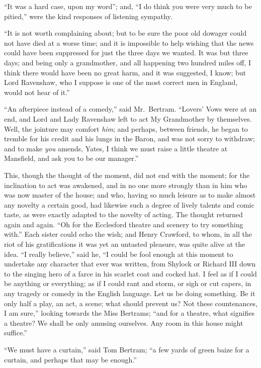 \documentclass{article}
\begin{document}
``It was a hard case, upon my word''; and, ``I do think you
were very much to be pitied,'' were the kind responses
of listening sympathy.

``It is not worth complaining about; but to be sure the
poor old dowager could not have died at a worse time;
and it is impossible to help wishing that the news could
have been suppressed for just the three days we wanted.
It was but three days; and being only a grandmother,
and all happening two hundred miles off, I think there would
have been no great harm, and it was suggested, I know;
but Lord Ravenshaw, who I suppose is one of the most correct
men in England, would not hear of it.''

``An afterpiece instead of a comedy,'' said Mr.\ Bertram.
``Lovers' Vows were at an end, and Lord and Lady Ravenshaw
left to act My Grandmother by themselves.  Well, the jointure
may comfort \emph{him}; and perhaps, between friends, he began
to tremble for his credit and his lungs in the Baron,
and was not sorry to withdraw; and to make \emph{you} amends,
Yates, I think we must raise a little theatre at Mansfield,
and ask you to be our manager.''

This, though the thought of the moment, did not end
with the moment; for the inclination to act was awakened,
and in no one more strongly than in him who was now
master of the house; and who, having so much leisure
as to make almost any novelty a certain good, had likewise
such a degree of lively talents and comic taste,
as were exactly adapted to the novelty of acting.
The thought returned again and again.  ``Oh for the
Ecclesford theatre and scenery to try something with.''
Each sister could echo the wish; and Henry Crawford,
to whom, in all the riot of his gratifications it was
yet an untasted pleasure, was quite alive at the idea.
``I really believe,'' said he, ``I could be fool enough
at this moment to undertake any character that ever
was written, from Shylock or Richard III down to the singing
hero of a farce in his scarlet coat and cocked hat.
I feel as if I could be anything or everything;
as if I could rant and storm, or sigh or cut capers,
in any tragedy or comedy in the English language.  Let us
be doing something.  Be it only half a play, an act, a scene;
what should prevent us?  Not these countenances, I am sure,''
looking towards the Miss Bertrams; ``and for a theatre,
what signifies a theatre?  We shall be only amusing ourselves.
Any room in this house might suffice.''

``We must have a curtain,'' said Tom Bertram; ``a few yards
of green baize for a curtain, and perhaps that may be enough.''
\end{document}
